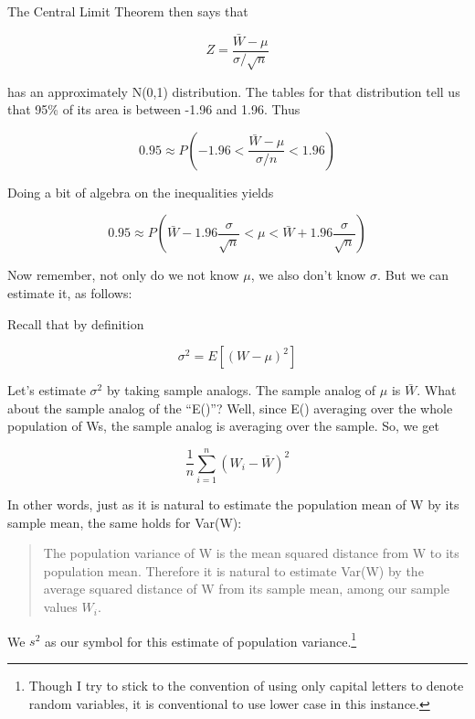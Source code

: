 The Central Limit Theorem then says that

\begin{equation}
Z = \frac{\bar{W}-\mu}{\sigma/\sqrt{n}}
\end{equation}

has an approximately N(0,1) distribution.  The tables for that
distribution tell us that 95\% of its area is between -1.96 and 1.96.
Thus

\begin{equation}
0.95 \approx P \left (-1.96 <  \frac{\bar{W}-\mu}{\sigma/n} < 1.96 \right )
\end{equation}

Doing a bit of algebra on the inequalities yields

\begin{equation}
\label{preci}
0.95 \approx P \left ( \bar{W} - 1.96 \frac{\sigma}{\sqrt{n}} < \mu
< \bar{W} + 1.96 \frac{\sigma}{\sqrt{n}} \right )
\end{equation}

Now remember, not only do we not know $\mu$, we also don't know
$\sigma$.  But we can estimate it, as follows:

Recall that by definition

\begin{equation}
\sigma^2 = E[(W-\mu)^2]
\end{equation}

Let's estimate $\sigma^2$ by taking sample analogs.  The sample analog
of $\mu$ is $\bar{W}$.  What about the sample analog of the ``E()''?
Well, since E() averaging over the whole population of Ws, the sample
analog is averaging over the sample.  So, we get

\begin{equation}
\label{s2}
\frac{1}{n} \sum_{i=1}^{n} (W_i-\bar{W})^2 
\end{equation}

In other words, just as it is natural to estimate the population mean of
W by its sample mean, the same holds for Var(W):

\begin{quote}
The population variance of W is the mean squared distance from W to its
population mean.  Therefore it is natural to estimate Var(W) by the
average squared distance of W from its sample mean, among our sample
values $W_i$.
\end{quote}

We $s^2$ as our symbol for this estimate of population
variance.\footnote{Though I try to stick to the convention of using only
capital letters to denote random variables, it is conventional to use
lower case in this instance.}

